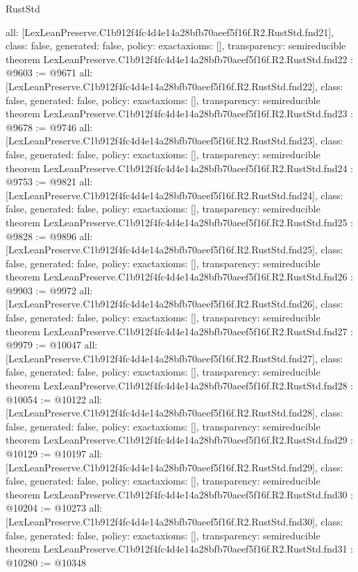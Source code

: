 \begin{lexlean}{RustStd}
\begin{coremodule}
{  all: [LexLeanPreserve.C1b912f4fc4d4e14a28bfb70aeef5f16f.R2.RustStd.fnd21],
  class: false,
  generated: false,
  policy: exact{axioms: []},
  transparency: semireducible
}
theorem LexLeanPreserve.C1b912f4fc4d4e14a28bfb70aeef5f16f.R2.RustStd.fnd22 : @9603 := @9671 {
  all: [LexLeanPreserve.C1b912f4fc4d4e14a28bfb70aeef5f16f.R2.RustStd.fnd22],
  class: false,
  generated: false,
  policy: exact{axioms: []},
  transparency: semireducible
}
theorem LexLeanPreserve.C1b912f4fc4d4e14a28bfb70aeef5f16f.R2.RustStd.fnd23 : @9678 := @9746 {
  all: [LexLeanPreserve.C1b912f4fc4d4e14a28bfb70aeef5f16f.R2.RustStd.fnd23],
  class: false,
  generated: false,
  policy: exact{axioms: []},
  transparency: semireducible
}
theorem LexLeanPreserve.C1b912f4fc4d4e14a28bfb70aeef5f16f.R2.RustStd.fnd24 : @9753 := @9821 {
  all: [LexLeanPreserve.C1b912f4fc4d4e14a28bfb70aeef5f16f.R2.RustStd.fnd24],
  class: false,
  generated: false,
  policy: exact{axioms: []},
  transparency: semireducible
}
theorem LexLeanPreserve.C1b912f4fc4d4e14a28bfb70aeef5f16f.R2.RustStd.fnd25 : @9828 := @9896 {
  all: [LexLeanPreserve.C1b912f4fc4d4e14a28bfb70aeef5f16f.R2.RustStd.fnd25],
  class: false,
  generated: false,
  policy: exact{axioms: []},
  transparency: semireducible
}
theorem LexLeanPreserve.C1b912f4fc4d4e14a28bfb70aeef5f16f.R2.RustStd.fnd26 : @9903 := @9972 {
  all: [LexLeanPreserve.C1b912f4fc4d4e14a28bfb70aeef5f16f.R2.RustStd.fnd26],
  class: false,
  generated: false,
  policy: exact{axioms: []},
  transparency: semireducible
}
theorem LexLeanPreserve.C1b912f4fc4d4e14a28bfb70aeef5f16f.R2.RustStd.fnd27 : @9979 := @10047 {
  all: [LexLeanPreserve.C1b912f4fc4d4e14a28bfb70aeef5f16f.R2.RustStd.fnd27],
  class: false,
  generated: false,
  policy: exact{axioms: []},
  transparency: semireducible
}
theorem LexLeanPreserve.C1b912f4fc4d4e14a28bfb70aeef5f16f.R2.RustStd.fnd28 : @10054 := @10122 {
  all: [LexLeanPreserve.C1b912f4fc4d4e14a28bfb70aeef5f16f.R2.RustStd.fnd28],
  class: false,
  generated: false,
  policy: exact{axioms: []},
  transparency: semireducible
}
theorem LexLeanPreserve.C1b912f4fc4d4e14a28bfb70aeef5f16f.R2.RustStd.fnd29 : @10129 := @10197 {
  all: [LexLeanPreserve.C1b912f4fc4d4e14a28bfb70aeef5f16f.R2.RustStd.fnd29],
  class: false,
  generated: false,
  policy: exact{axioms: []},
  transparency: semireducible
}
theorem LexLeanPreserve.C1b912f4fc4d4e14a28bfb70aeef5f16f.R2.RustStd.fnd30 : @10204 := @10273 {
  all: [LexLeanPreserve.C1b912f4fc4d4e14a28bfb70aeef5f16f.R2.RustStd.fnd30],
  class: false,
  generated: false,
  policy: exact{axioms: []},
  transparency: semireducible
}
theorem LexLeanPreserve.C1b912f4fc4d4e14a28bfb70aeef5f16f.R2.RustStd.fnd31 : @10280 := @10348 {
}
\end{coremodule}
\end{lexlean}
